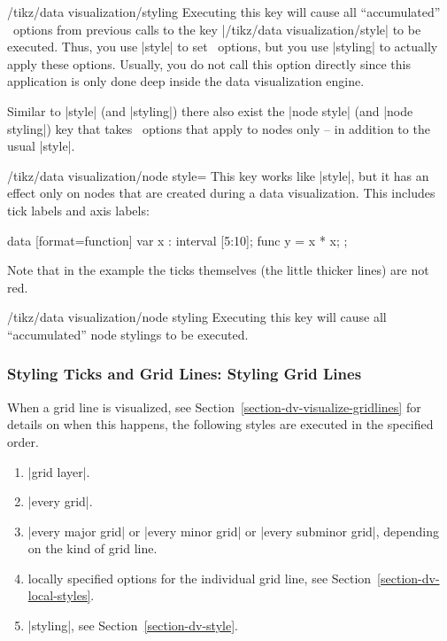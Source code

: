\begin{key}{/tikz/data visualization/styling}
    Executing this key will cause all ``accumulated'' \tikzname\ options from
    previous calls to the key |/tikz/data visualization/style| to be executed.
    Thus, you use |style| to set \tikzname\ options, but you use |styling| to
    actually apply these options. Usually, you do not call this option directly
    since this application is only done deep inside the data visualization
    engine.
\end{key}

Similar to |style| (and |styling|) there also exist the |node style| (and
|node styling|) key that takes \tikzname\ options that apply to nodes only --
in addition to the usual |style|.

\begin{key}{/tikz/data visualization/node style=}
    This key works like |style|, but it has an effect only on nodes that are
    created during a data visualization. This includes tick labels and axis
    labels:
\begin{codeexample}[preamble={\usetikzlibrary{datavisualization.formats.functions}}]
\tikz \datavisualization
  [scientific axes,
   all axes={ticks={node style=red}, length=3cm},
   visualize as line]
  data [format=function] {
    var x : interval [5:10];
    func y = \value x * \value x;
  };
\end{codeexample}
    Note that in the example the ticks themselves (the little thicker lines)
    are not red.
\end{key}

\begin{key}{/tikz/data visualization/node styling}
    Executing this key will cause all ``accumulated'' node stylings to be
    executed.
\end{key}


\subsubsection{Styling Ticks and Grid Lines: Styling Grid Lines}
\label{section-dv-styling-grid-lines}

When a grid line is visualized, see
Section~\ref{section-dv-visualize-gridlines} for details on when this happens,
the following styles are executed in the specified order.
%
\begin{enumerate}
    \item |grid layer|.
    \item |every grid|.
    \item |every major grid| or |every minor grid| or |every subminor grid|,
        depending on the kind of grid line.
    \item locally specified options for the individual grid line, see
        Section~\ref{section-dv-local-styles}.
    \item |styling|, see Section~\ref{section-dv-style}.
\end{enumerate}

